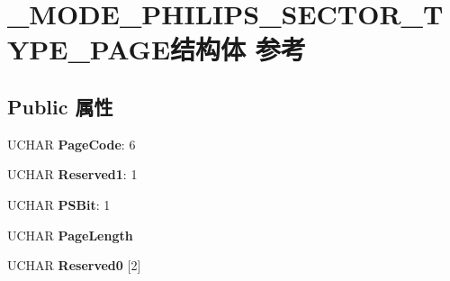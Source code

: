 \hypertarget{struct___m_o_d_e___p_h_i_l_i_p_s___s_e_c_t_o_r___t_y_p_e___p_a_g_e}{}\section{\+\_\+\+M\+O\+D\+E\+\_\+\+P\+H\+I\+L\+I\+P\+S\+\_\+\+S\+E\+C\+T\+O\+R\+\_\+\+T\+Y\+P\+E\+\_\+\+P\+A\+G\+E结构体 参考}
\label{struct___m_o_d_e___p_h_i_l_i_p_s___s_e_c_t_o_r___t_y_p_e___p_a_g_e}
\subsection*{Public 属性}
\begin{DoxyCompactItemize}
\item 
\mbox{\label{struct___m_o_d_e___p_h_i_l_i_p_s___s_e_c_t_o_r___t_y_p_e___p_a_g_e_a1dfe839b9ae9c1f8e6d376df733a0bf5}} 
U\+C\+H\+AR {\bfseries Page\+Code}\+: 6
\item 
\mbox{\label{struct___m_o_d_e___p_h_i_l_i_p_s___s_e_c_t_o_r___t_y_p_e___p_a_g_e_a158d387b17b2aed02355cefa2b421e77}} 
U\+C\+H\+AR {\bfseries Reserved1}\+: 1
\item 
\mbox{\label{struct___m_o_d_e___p_h_i_l_i_p_s___s_e_c_t_o_r___t_y_p_e___p_a_g_e_a75e1cf9cef52f23a89b5c003c27fdf08}} 
U\+C\+H\+AR {\bfseries P\+S\+Bit}\+: 1
\item 
\mbox{\label{struct___m_o_d_e___p_h_i_l_i_p_s___s_e_c_t_o_r___t_y_p_e___p_a_g_e_ad6ea62f7ddf7adde468d1376c07b535d}} 
U\+C\+H\+AR {\bfseries Page\+Length}
\item 
\mbox{\label{struct___m_o_d_e___p_h_i_l_i_p_s___s_e_c_t_o_r___t_y_p_e___p_a_g_e_aa1fe763226b41f0a58b4ccd9c720e615}} 
U\+C\+H\+AR {\bfseries Reserved0} \mbox{[}2\mbox{]}
\item 
\mbox{\label{struct___m_o_d_e___p_h_i_l_i_p_s___s_e_c_t_o_r___t_y_p_e___p_a_g_e_a4d2c1c1b9b5fbef92bc82663227e9b84}} 

\end{DoxyCompactItemize}

